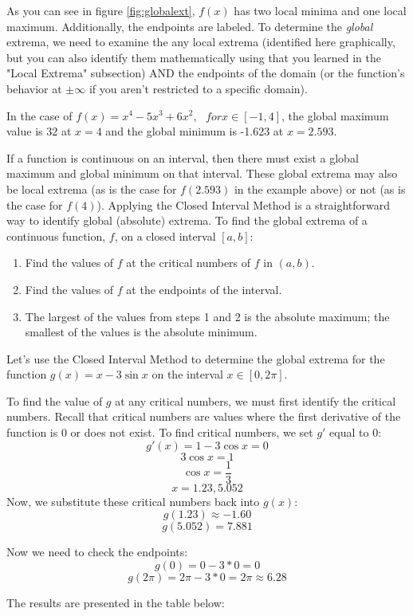 As you can see in figure \ref{fig:globalext}, $f(x)$ has two local minima and one local maximum. Additionally, the endpoints are labeled. To determine the \textit{global} extrema, we need to examine the any local extrema (identified here graphically, but you can also identify them mathematically using that you learned in the "Local Extrema" subsection) AND the endpoints of the domain (or the function's behavior at $\pm \infty$ if you aren't restricted to a specific domain). 

In the case of $f(x) = x^4-5x^3+6x^2,\text{ }for x\in [-1,4]$, the global maximum value is 32 at $x=4$ and the global minimum is -1.623 at $x=2.593$. 

If a function is continuous on an interval, then there must exist a global maximum and global minimum on that interval. These global extrema may also be local extrema (as is the case for $f(2.593)$ in the example above) or not (as is the case for $f(4)$). Applying the Closed Interval Method is a straightforward way to identify global (absolute) extrema. To find the global extrema of a continuous function, $f$, on a closed interval $[a, b]$:
\begin{enumerate}
	\item Find the values of $f$ at the critical numbers of $f$ in $(a, b)$.
	\item Find the values of $f$ at the endpoints of the interval.
	\item The largest of the values from steps 1 and 2 is the absolute maximum; the smallest of the values is the absolute minimum.
\end{enumerate}

Let's use the Closed Interval Method to determine the global extrema for the function $g(x) = x-3\sin{x}$ on the interval $x \in [0, 2\pi]$.

To find the value of $g$ at any critical numbers, we must first identify the critical numbers. Recall that critical numbers are values where the first derivative of the function is $0$ or does not exist. To find critical numbers, we set $g'$ equal to $0$:
$$g'(x) = 1-3\cos{x}=0$$
$$3\cos{x} = 1$$
$$\cos{x} = \frac{1}{3}$$
$$x=1.23, 5.052$$
Now, we substitute these critical numbers back into $g(x)$:
$$g(1.23) \approx -1.60$$
$$g(5.052) = 7.881$$

Now we need to check the endpoints:
$$g(0) = 0-3*0 = 0$$
$$g(2\pi) = 2\pi - 3*0 = 2\pi \approx 6.28$$

The results are presented in the table below:

